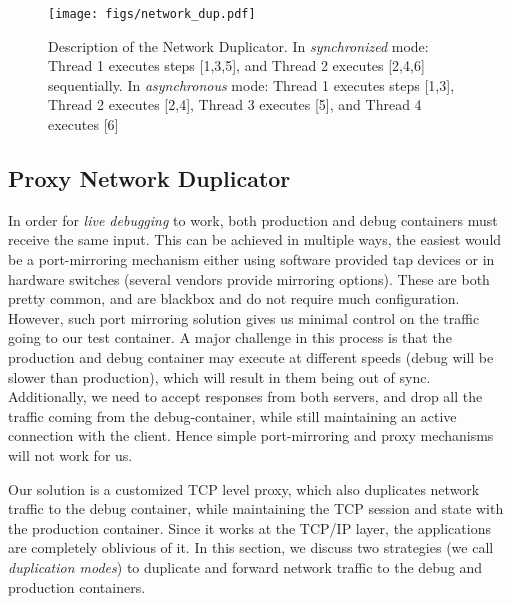 \begin{figure}[ht]
  \begin{centering}
    \texttt{[image: figs/network\_dup.pdf]}
    \caption{Description of the Network Duplicator. In \textit{synchronized} mode: Thread 1 executes steps [1,3,5], and Thread 2 executes [2,4,6] sequentially. In \textit{asynchronous} mode: Thread 1 executes steps [1,3], Thread 2 executes [2,4], Thread 3 executes [5], and Thread 4 executes [6]}
    \label{fig:duplicator}
  \end{centering}
\end{figure}

\subsection{Proxy Network Duplicator} 
\label{sec:proxyDuplicator}

In order for \textit{live debugging} to work, both production and debug containers must receive the same input.
This can be achieved in multiple ways, the easiest would be a port-mirroring mechanism either using software provided tap devices or in hardware switches (several vendors provide mirroring options). 
These are both pretty common, and are blackbox and do not require much configuration.
However, such port mirroring solution gives us minimal control on the traffic going to our test container.
A major challenge in this process is that the production and debug container may execute at different speeds (debug will be slower than production), which will result in them being out of sync.
Additionally, we need to accept responses from both servers, and drop all the traffic coming from the debug-container, while still maintaining an active connection with the client.
Hence simple port-mirroring and proxy mechanisms will not work for us.

Our solution is a customized TCP level proxy, which also duplicates network traffic to the debug container, while maintaining the TCP session and state with the production container. 
Since it works at the TCP/IP layer, the applications are completely oblivious of it.
In this section, we discuss two strategies (we call \textit{duplication modes}) to duplicate and forward network traffic to the debug and production containers.
%

